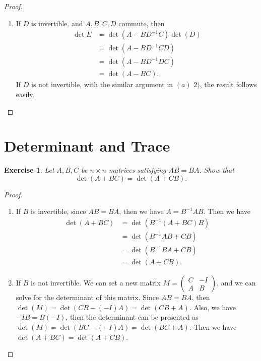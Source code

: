 \documentclass[10pt]{book}
\newtheorem{exercise}{Exercise}[section]
\theoremstyle{definition}
\numberwithin{equation}{chapter}
\begin{document}
\begin{proof}
\begin{enumerate}[label=(\alph*)]
    \item If $D$ is invertible, and $A, B, C, D$ commute, then 
    \begin{align*}
        \det E & = \det (A-BD^{-1}C) \det(D) \\
        & = \det (A-BD^{-1}CD) \\
        & = \det (A-BD^{-1}DC) \\
        & = \det (A-BC).
    \end{align*}
    If $D$ is not invertible, with the similar argument in $(a)\,\,2)$, the result follows easily.
\end{enumerate}
\end{proof}

\medskip

\section{Determinant and Trace}
\begin{exercise}
Let $A,B,C$ be $n\times n$ matrices satisfying $AB=BA$. Show that
$$
\det\left(  A+BC\right)  =\det\left(  A+CB\right).
$$
\end{exercise}
\begin{proof}
~\begin{enumerate}[label=(\alph*)]
    \item If $B$ is invertible, since $AB=BA$, then we have $A=B^{-1}AB$. Then we have
    \begin{align*}
        \det (A+BC) &= \det (B^{-1}(A + BC)B) \\
        & = \det(B^{-1}AB + CB) \\
        & = \det(B^{-1}BA + CB)\\
        & = \det(A + CB).
    \end{align*}
    \item If $B$ is not invertible. We can set a new matrix $M = \begin{pmatrix}
    C & -I \\
    A & B
    \end{pmatrix}$, and we can solve for the determinant of this matrix. Since $AB=BA$, then $\det(M)=\det(CB-(-I)A)=\det(CB+A)$. Also, we have $-IB=B(-I)$, then the determinant can be presented as $\det (M)=\det(BC-(-I)A)=\det(BC+A)$. Then we have $\det(A+BC)=\det(A+CB)$. 
\end{enumerate}
\end{proof}
\end{document}
